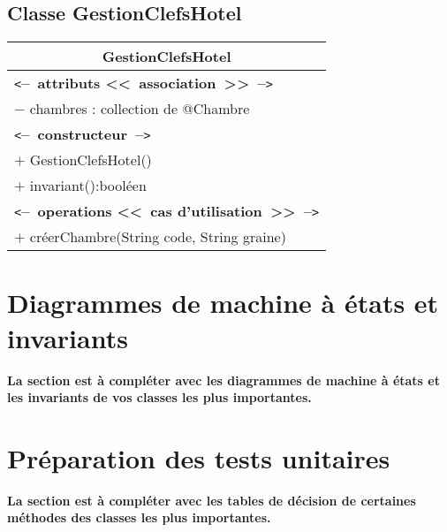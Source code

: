 \documentclass[11pt,article]{article}
\newcommand{\cmt}[1]{\texttt{<}\textbf{--~#1~--}\texttt{>}}
\begin{document}
\subsection{Classe \textsf{GestionClefsHotel}}

\begin{center}
\begin{longtable}{|p{15cm}|}
\hline
\multicolumn{1}{|c|}{{\Large \textsf{GestionClefsHotel}}} \\
\hline
\cmt{attributs <<~association~>>}\\
$-$ chambres : collection de @Chambre \\
\hline
\cmt{constructeur} \\
$+$ GestionClefsHotel()\\
$+$ invariant():booléen\\
\cmt{operations <<~cas d'utilisation~>>} \\
$+$ créerChambre(String code, String graine) \\
\hline
\end{longtable}%
\end{center}

\newpage

\section{Diagrammes de machine à états et invariants}

{\color{red}\textbf{La section est à compléter avec les diagrammes de
    machine à états et les invariants de vos classes les plus
    importantes.}}

\newpage

\section{Préparation des tests unitaires}

{\color{red}\textbf{La section est à compléter avec les tables de
    décision de certaines méthodes des classes les plus importantes.}}
\end{document}
